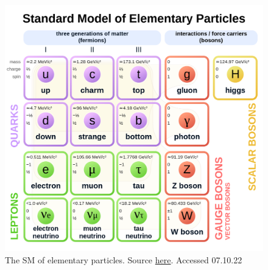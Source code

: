 
\begin{figure}[H]
    \includegraphics[width=\linewidth]{Figures/SM/Standard_Model_of_Elementary_Particles.svg.png}
    \caption[The Standard Model]{The SM of elementary particles. Source \href{https://upload.wikimedia.org/wikipedia/commons/thumb/0/00/Standard_Model_of_Elementary_Particles.svg/1200px-Standard_Model_of_Elementary_Particles.svg.png}{here}. Accessed 07.10.22}
    \label{fig:smdiagram}
\end{figure}

